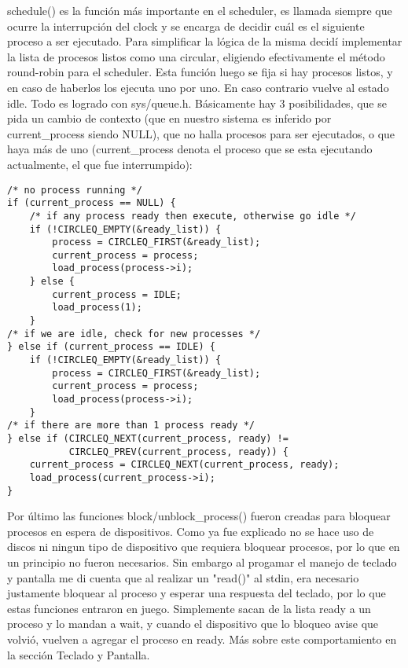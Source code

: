 schedule() es la función más importante en el scheduler, es llamada siempre
que ocurre la interrupción del clock y se encarga de decidir cuál es el
siguiente proceso a ser ejecutado. Para simplificar la lógica de la misma
decidí implementar la lista de procesos listos como una circular, eligiendo
efectivamente el método round-robin para el scheduler. Esta función luego se
fija si hay procesos listos, y en caso de haberlos los ejecuta uno por uno. En
caso contrario vuelve al estado idle. Todo es logrado con sys/queue.h.
Básicamente hay 3 posibilidades, que se pida un cambio de contexto (que en
nuestro sistema es inferido por current\_process siendo NULL), que no halla
procesos para ser ejecutados, o que haya más de uno (current\_process denota el
proceso que se esta ejecutando actualmente, el que fue interrumpido):

\begin{verbatim}
/* no process running */
if (current_process == NULL) {
    /* if any process ready then execute, otherwise go idle */
    if (!CIRCLEQ_EMPTY(&ready_list)) {
        process = CIRCLEQ_FIRST(&ready_list);
        current_process = process;
        load_process(process->i);
    } else {
        current_process = IDLE;
        load_process(1);
    }
/* if we are idle, check for new processes */
} else if (current_process == IDLE) {
    if (!CIRCLEQ_EMPTY(&ready_list)) {
        process = CIRCLEQ_FIRST(&ready_list);
        current_process = process;
        load_process(process->i);
    }
/* if there are more than 1 process ready */
} else if (CIRCLEQ_NEXT(current_process, ready) !=
           CIRCLEQ_PREV(current_process, ready)) {
    current_process = CIRCLEQ_NEXT(current_process, ready);
    load_process(current_process->i);
}
\end{verbatim}

Por último las funciones block/unblock\_process() fueron creadas para bloquear
procesos en espera de dispositivos. Como ya fue explicado no se hace uso de
discos ni ningun tipo de dispositivo que requiera bloquear procesos, por lo que
en un principio no fueron necesarios. Sin embargo al progamar el manejo de
teclado y pantalla me di cuenta que al realizar un "read()" al stdin, era
necesario  justamente bloquear al proceso y esperar una respuesta del teclado,
por lo que estas funciones entraron en juego. Simplemente sacan de la lista
ready a un proceso y lo mandan a wait, y cuando el dispositivo que lo bloqueo
avise que volvió, vuelven a agregar el proceso en ready. Más sobre este
comportamiento en la sección Teclado y Pantalla.

